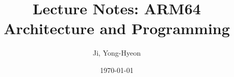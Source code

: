 \documentclass[12pt]{article}
\begin{document}
	
	\title{Lecture Notes: ARM64 Architecture and Programming}
	\author{Ji, Yong-Hyeon}
	\date{\today}
	\maketitle
	
	\tableofcontents  %
	\newpage
	
%	
%	
%	
\end{document}

